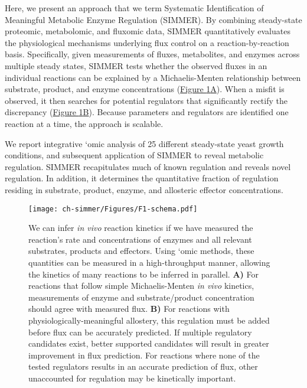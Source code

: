 Here, we present an approach that we term Systematic Identification of Meaningful Metabolic Enzyme Regulation (SIMMER). By combining steady-state proteomic, metabolomic, and fluxomic data, SIMMER quantitatively evaluates the physiological mechanisms underlying flux control on a reaction-by-reaction basis. Specifically, given measurements of fluxes, metabolites, and enzymes across multiple steady states, SIMMER tests whether the observed fluxes in an individual reactions can be explained by a Michaelis-Menten relationship between substrate, product, and enzyme concentrations (\hyperref[fig:schema]{Figure \ref{fig:schema}A}). When a misfit is observed, it then searches for potential regulators that significantly rectify the discrepancy (\hyperref[fig:schema]{Figure \ref{fig:schema}B}). Because parameters and regulators are identified one reaction at a time, the approach is scalable.

We report integrative `omic analysis of 25 different steady-state yeast growth conditions, and subsequent application of SIMMER to reveal metabolic regulation. SIMMER recapitulates much of known regulation and reveals novel regulation. In addition, it determines the quantitative fraction of regulation residing in substrate, product, enzyme, and allosteric effector concentrations.

\begin{figure}[h!]
\texttt{[image: ch-simmer/Figures/F1-schema.pdf]}
\caption[We can infer \textit{in vivo} reaction kinetics if we have measured the reaction's rate and concentrations of enzymes and all relevant substrates, products and effectors]{We can infer \textit{in vivo} reaction kinetics if we have measured the reaction's rate and concentrations of enzymes and all relevant substrates, products and effectors.  Using `omic methods, these quantities can be measured in a high-throughput manner, allowing the kinetics of many reactions to be inferred in parallel.  \textbf{A)} For reactions that follow simple Michaelis-Menten \textit{in vivo} kinetics, measurements of enzyme and substrate/product concentration should agree with measured flux.  \textbf{B)} For reactions with physiologically-meaningful allostery, this regulation must be added before flux can be accurately predicted.  If multiple regulatory candidates exist, better supported candidates will result in greater improvement in flux prediction.  For reactions where none of the tested regulators results in an accurate prediction of flux, other unaccounted for regulation may be kinetically important.}
\label{fig:schema}
\end{figure}

